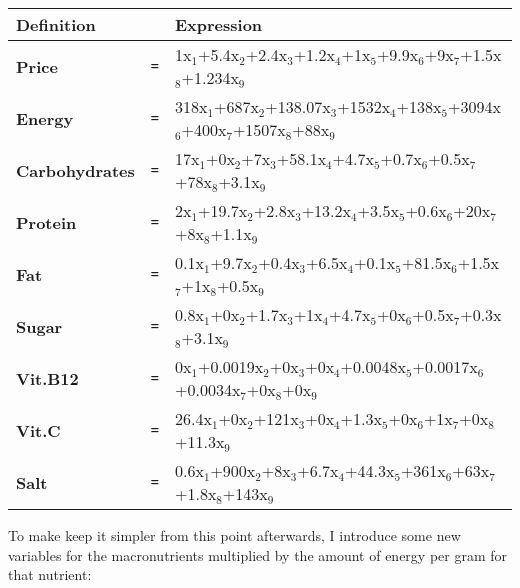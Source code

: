 \documentclass[margin=0.3in]{article}
\begin{document}
\begin{center}
\begin{tabular}{lll}
\hline
\textbf{Definition} &  & \textbf{Expression}\\
\hline
\textbf{Price} & \verb~=~ & 1x$_{\text{1}}$+5.4x$_{\text{2}}$+2.4x$_{\text{3}}$+1.2x$_{\text{4}}$+1x$_{\text{5}}$+9.9x$_{\text{6}}$+9x$_{\text{7}}$+1.5x$_{\text{8}}$+1.234x$_{\text{9}}$\\
\hline
\textbf{Energy} & \verb~=~ & 318x$_{\text{1}}$+687x$_{\text{2}}$+138.07x$_{\text{3}}$+1532x$_{\text{4}}$+138x$_{\text{5}}$+3094x$_{\text{6}}$+400x$_{\text{7}}$+1507x$_{\text{8}}$+88x$_{\text{9}}$\\
\hline
\textbf{Carbohydrates} & \verb~=~ & 17x$_{\text{1}}$+0x$_{\text{2}}$+7x$_{\text{3}}$+58.1x$_{\text{4}}$+4.7x$_{\text{5}}$+0.7x$_{\text{6}}$+0.5x$_{\text{7}}$+78x$_{\text{8}}$+3.1x$_{\text{9}}$\\
\hline
\textbf{Protein} & \verb~=~ & 2x$_{\text{1}}$+19.7x$_{\text{2}}$+2.8x$_{\text{3}}$+13.2x$_{\text{4}}$+3.5x$_{\text{5}}$+0.6x$_{\text{6}}$+20x$_{\text{7}}$+8x$_{\text{8}}$+1.1x$_{\text{9}}$\\
\hline
\textbf{Fat} & \verb~=~ & 0.1x$_{\text{1}}$+9.7x$_{\text{2}}$+0.4x$_{\text{3}}$+6.5x$_{\text{4}}$+0.1x$_{\text{5}}$+81.5x$_{\text{6}}$+1.5x$_{\text{7}}$+1x$_{\text{8}}$+0.5x$_{\text{9}}$\\
\hline
\textbf{Sugar} & \verb~=~ & 0.8x$_{\text{1}}$+0x$_{\text{2}}$+1.7x$_{\text{3}}$+1x$_{\text{4}}$+4.7x$_{\text{5}}$+0x$_{\text{6}}$+0.5x$_{\text{7}}$+0.3x$_{\text{8}}$+3.1x$_{\text{9}}$\\
\hline
\textbf{Vit.B12} & \verb~=~ & 0x$_{\text{1}}$+0.0019x$_{\text{2}}$+0x$_{\text{3}}$+0x$_{\text{4}}$+0.0048x$_{\text{5}}$+0.0017x$_{\text{6}}$+0.0034x$_{\text{7}}$+0x$_{\text{8}}$+0x$_{\text{9}}$\\
\hline
\textbf{Vit.C} & \verb~=~ & 26.4x$_{\text{1}}$+0x$_{\text{2}}$+121x$_{\text{3}}$+0x$_{\text{4}}$+1.3x$_{\text{5}}$+0x$_{\text{6}}$+1x$_{\text{7}}$+0x$_{\text{8}}$+11.3x$_{\text{9}}$\\
\hline
\textbf{Salt} & \verb~=~ & 0.6x$_{\text{1}}$+900x$_{\text{2}}$+8x$_{\text{3}}$+6.7x$_{\text{4}}$+44.3x$_{\text{5}}$+361x$_{\text{6}}$+63x$_{\text{7}}$+1.8x$_{\text{8}}$+143x$_{\text{9}}$\\
\hline
\end{tabular}
\end{center}

To make keep it simpler from this point afterwards, I introduce some new variables for the macronutrients multiplied by the amount of energy per gram for that nutrient:
\end{document}
